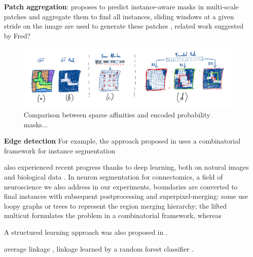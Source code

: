 \textbf{Patch aggregation}: \cite{liu2016multi} proposes to predict instance-aware masks in multi-scale patches and aggregate them to find all instances, sliding windows at a given stride on the image are used to generate these patches , related work suggested by Fred?



\begin{figure}[t]
\centering
        \includegraphics[width=\textwidth]{./figs/masks_explained.jpg} %
        \caption{Comparison between sparse affinities and encoded probability masks...}
    \label{fig:comparing_masks_affs}
\end{figure}





\textbf{Edge detection} 
For example, the approach proposed in \cite{kirillov2017instancecut} uses a combinatorial framework for instance segmentation

also experienced recent progress thanks to deep learning, both on natural images \cite{Gao_2019_ICCV,liu2018affinity,xie2015holistically,kokkinos2015pushing} and biological data \cite{lee2017superhuman,schmidt2018cell,meirovitch2016multi,ciresan2012deep}. In neuron segmentation for connectomics, a field of neuroscience we also address in our experiments, boundaries are converted to final instances with subsequent postprocessing and superpixel-merging:
some use loopy graphs \cite{kaynig2015large,krasowski2015improving} or trees \cite{meirovitch2016multi,liu2016sshmt,liu2014modular,funke2015learning,uzunbas2016efficient} to represent the region merging hierarchy; the lifted multicut \cite{beier2017multicut} formulates the problem in a combinatorial framework, whereas 

A structured learning approach was also proposed in \cite{funke2018large,turaga2009maximin}.

\TODO{}
 average linkage \cite{liu2018affinity,lee2017superhuman}, linkage learned by a random forest classifier \cite{nunez2013machine,knowles2016rhoananet}.


